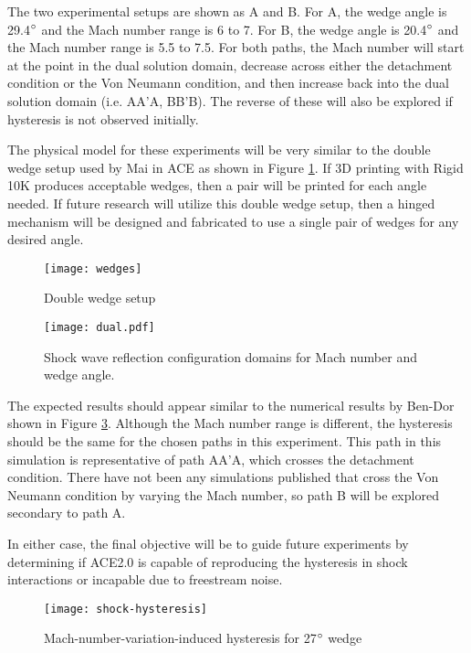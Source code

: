The two experimental setups are shown as A and B. For A, the wedge angle is 29.4$\degree$ and the Mach number range is 6 to 7. For B, the wedge angle is 20.4$\degree$ and the Mach number range is 5.5 to 7.5. For both paths, the Mach number will start at the point in the dual solution domain, decrease across either the detachment condition or the Von Neumann condition, and then increase back into the dual solution domain (i.e. AA'A, BB'B). The reverse of these will also be explored if hysteresis is not observed initially.

The physical model for these experiments will be very similar to the double wedge setup used by Mai in ACE as shown in Figure \ref{fig:wedges}. If 3D printing with Rigid 10K produces acceptable wedges, then a pair will be printed for each angle needed. If future research will utilize this double wedge setup, then a hinged mechanism will be designed and fabricated to use a single pair of wedges for any desired angle.

\begin{figure}[ht!]
    \centering
    \texttt{[image: wedges]}
    \caption[Double wedge setup]{Double wedge setup \cite{mai-dis}}
    \label{fig:wedges}
\end{figure}


\begin{figure}[ht!]
    \centering
    \texttt{[image: dual.pdf]}
    \caption{Shock wave reflection configuration domains for Mach number and wedge angle.}
    \label{fig:dual}
\end{figure}

The expected results should appear similar to the numerical results by Ben-Dor shown in Figure \ref{fig:shock-hysteresis}. Although the Mach number range is different, the hysteresis should be the same for the chosen paths in this experiment. This path in this simulation is representative of path AA'A, which crosses the detachment condition. There have not been any simulations published that cross the Von Neumann condition by varying the Mach number, so path B will be explored secondary to path A.

In either case, the final objective will be to guide future experiments by determining if ACE2.0 is capable of reproducing the hysteresis in shock interactions or incapable due to freestream noise. 

\begin{figure}[ht!]
    \centering
    \texttt{[image: shock-hysteresis]}
    \caption[Mach-number-varitation-induced hysteresis for 27$\degree$ wedge]{Mach-number-variation-induced hysteresis for 27$\degree$ wedge \cite{ben-dor-1}}
    \label{fig:shock-hysteresis}
\end{figure}




